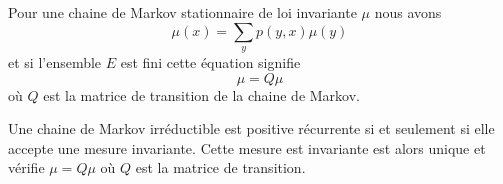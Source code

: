 \begin{remark}\label{RemcOEylF}
	Pour une chaine de Markov stationnaire de loi invariante \( \mu\) nous avons
	\begin{equation}
		\mu(x)=\sum_yp(y,x)\mu(y)
	\end{equation}
	et si l'ensemble \( E\) est fini cette équation signifie
	\begin{equation}
		\mu=Q\mu
	\end{equation}
	où \( Q\) est la matrice de transition de la chaine de Markov.
\end{remark}


\begin{theorem}
	Une chaine de Markov irréductible est positive récurrente si et seulement si elle accepte une mesure invariante. Cette mesure est invariante est alors unique et vérifie \( \mu=Q\mu\) où \( Q\) est la matrice de transition.
\end{theorem}

